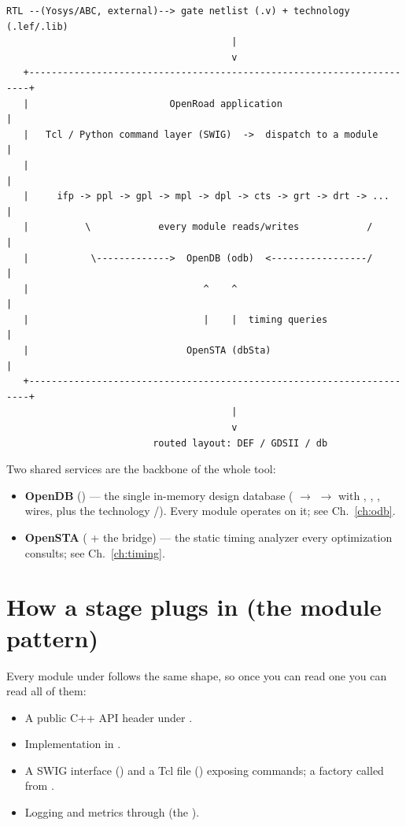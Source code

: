 \begin{lstlisting}[style=ortcl]
   RTL --(Yosys/ABC, external)--> gate netlist (.v) + technology (.lef/.lib)
                                        |
                                        v
   +----------------------------------------------------------------------+
   |                         OpenRoad application                         |
   |   Tcl / Python command layer (SWIG)  ->  dispatch to a module        |
   |                                                                      |
   |     ifp -> ppl -> gpl -> mpl -> dpl -> cts -> grt -> drt -> ...       |
   |          \            every module reads/writes            /         |
   |           \------------->  OpenDB (odb)  <-----------------/          |
   |                               ^    ^                                 |
   |                               |    |  timing queries                 |
   |                            OpenSTA (dbSta)                            |
   +----------------------------------------------------------------------+
                                        |
                                        v
                          routed layout: DEF / GDSII / db
\end{lstlisting}

Two shared services are the backbone of the whole tool:

\begin{itemize}
  \item \textbf{OpenDB} () --- the single in-memory design database
        ( $\rightarrow$  $\rightarrow$ 
        with , , , wires, plus the technology
        /). Every module operates on it; see Ch.~\ref{ch:odb}.
  \item \textbf{OpenSTA} ( + the  bridge) --- the
        static timing analyzer every optimization consults; see Ch.~\ref{ch:timing}.
\end{itemize}

\section{How a stage plugs in (the module pattern)}

Every module under  follows the same shape, so once you can read one
you can read all of them:

\begin{itemize}
  \item A public C++ API header under .
  \item Implementation in .
  \item A SWIG interface () and a Tcl file () exposing
        commands; a  factory called from .
  \item Logging and metrics through  (the ).
\end{itemize}

